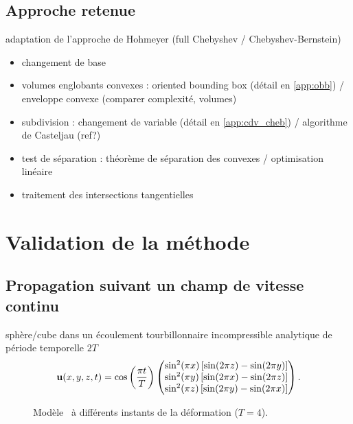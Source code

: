 \subsection{Approche retenue}
\label{sec:calcul_intersections}
adaptation de l'approche de Hohmeyer \cite{hohmeyer1992} (full Chebyshev / Chebyshev-Bernstein)
\begin{itemize}
	\item changement de base \cite{rababah2003}
	\item volumes englobants convexes : oriented bounding box \cite{fournier1994} (détail en \autoref{app:obb}) / enveloppe convexe (comparer complexité, volumes)
	\item subdivision : changement de variable (détail en \autoref{app:cdv_cheb}) / algorithme de Casteljau (ref?) 
	\item test de séparation : théorème de séparation des convexes \cite{eberly2002} / optimisation linéaire \cite{seidel1991}
	\item traitement des intersections tangentielles
\end{itemize}



\section{Validation de la méthode}

\subsection{Propagation suivant un champ de vitesse continu}
sphère/cube dans un écoulement tourbillonnaire incompressible analytique de période temporelle $2T$\\
\begin{equation}
	\mathbf{u}(x,y,z,t) = \cos \left( \frac{\pi t}{T} \right)
	\begin{pmatrix} 
	\sin^2(\pi x) \left[ \sin(2\pi z) - \sin(2\pi y)\right] \\
\sin^2(\pi y) \left[ \sin(2\pi x) - \sin(2\pi z)\right] \\
\sin^2(\pi z) \left[ \sin(2\pi y) - \sin(2\pi x)\right]
	 \end{pmatrix}.
\end{equation}
%	

\begin{figure}
	\centering
	
	\caption{Modèle \brep\ à différents instants de la déformation ($T=4$).}
	\label{fig:snapshots_vortex}
\end{figure}

